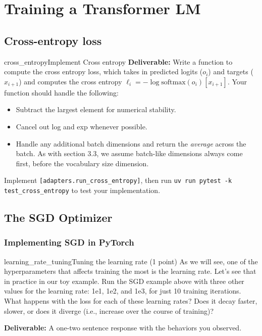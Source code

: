 \section{Training a Transformer LM}

\subsection{Cross-entropy loss}

\begin{problembox}{cross\_entropy}{Implement Cross entropy}
    \textbf{Deliverable:} Write a function to compute the cross entropy loss, which takes in predicted logits ($o_i$) and targets ($x_{i+1}$) and computes the cross entropy $\ell_i = -\log \mathrm{softmax}(o_i)[x_{i+1}]$. Your function should handle the following:

    \begin{itemize}[itemsep=0.5em, parsep=0pt, topsep=0.5em]
        \item Subtract the largest element for numerical stability.
        \item Cancel out log and exp whenever possible.
        \item Handle any additional batch dimensions and return the \textit{average} across the batch. As with section 3.3, we assume batch-like dimensions always come first, before the vocabulary size dimension.
    \end{itemize}

    \vspace{0.5em}
    Implement \texttt{[adapters.run\_cross\_entropy]}, then run \texttt{uv run pytest -k test\_cross\_entropy} to test your implementation.
\end{problembox}

\subsection{The SGD Optimizer}

\subsubsection{Implementing SGD in PyTorch}

\begin{problembox}{learning\_rate\_tuning}{Tuning the learning rate \hfill (1 point)}
    As we will see, one of the hyperparameters that affects training the most is the learning rate. Let's see that in practice in our toy example. Run the SGD example above with three other values for the learning rate: 1e1, 1e2, and 1e3, for just 10 training iterations. What happens with the loss for each of these learning rates? Does it decay faster, slower, or does it diverge (i.e., increase over the course of training)?

    \vspace{0.5em}
    \textbf{Deliverable:} A one-two sentence response with the behaviors you observed.
\end{problembox}


